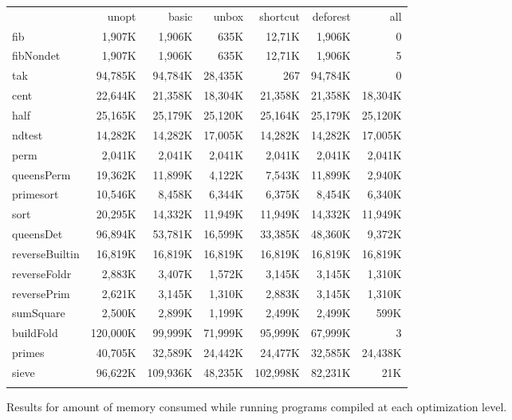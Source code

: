 \documentclass{book}
\theoremstyle{definition}
\begin{document}
\begin{figure}
\begin{tabular}{||l||r|r|r|r|r|r||}
\hhline{||=||=|=|=|=|=|=||}
                &    unopt &    basic &   unbox &  shortcut &  deforest &     all \\
\hhline{||=||=|=|=|=|=|=||}
fib             &   1,907K &   1,906K &    635K &    12,71K &    1,906K &       0 \\
\hline
fibNondet       &   1,907K &   1,906K &    635K &    12,71K &    1,906K &       5 \\
\hline
tak             &  94,785K &  94,784K & 28,435K &       267 &   94,784K &       0 \\
\hhline{||=||=|=|=|=|=|=||}
cent            &  22,644K &  21,358K & 18,304K &   21,358K &   21,358K & 18,304K \\
\hline
half            &  25,165K &  25,179K & 25,120K &   25,164K &   25,179K & 25,120K \\
\hline
ndtest          &  14,282K &  14,282K & 17,005K &   14,282K &   14,282K & 17,005K \\
\hline
perm            &   2,041K &   2,041K &  2,041K &    2,041K &    2,041K &  2,041K \\
\hline
queensPerm      &  19,362K &  11,899K &  4,122K &    7,543K &   11,899K &  2,940K \\
\hline
primesort       &  10,546K &   8,458K &  6,344K &    6,375K &    8,454K &  6,340K \\
\hline
sort            &  20,295K &  14,332K & 11,949K &   11,949K &   14,332K & 11,949K \\
\hhline{||=||=|=|=|=|=|=||}
queensDet       &  96,894K &  53,781K & 16,599K &   33,385K &   48,360K &  9,372K \\
\hline
reverseBuiltin  &  16,819K &  16,819K & 16,819K &   16,819K &   16,819K & 16,819K \\
\hline
reverseFoldr    &   2,883K &   3,407K &  1,572K &    3,145K &    3,145K &  1,310K \\
\hline
reversePrim     &   2,621K &   3,145K &  1,310K &    2,883K &    3,145K &  1,310K \\
\hline
sumSquare       &   2,500K &   2,899K &  1,199K &    2,499K &    2,499K &    599K \\
\hline
buildFold       & 120,000K &  99,999K & 71,999K &   95,999K &   67,999K &       3 \\
\hline
primes          &  40,705K &  32,589K & 24,442K &   24,477K &   32,585K & 24,438K \\
\hline
sieve           &  96,622K & 109,936K & 48,235K &  102,998K &   82,231K &     21K \\
\hhline{||=||=|=|=|=|=|=||}
\end{tabular}
\caption{Results for amount of memory consumed while running programs compiled at each optimization level.}
\label{fig:memory}
\end{figure}
\end{document}
